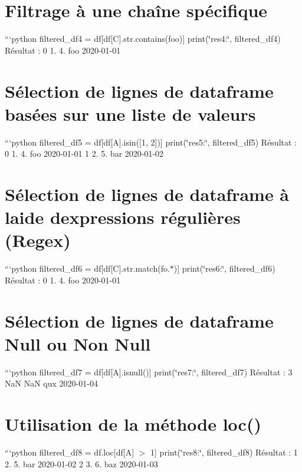 \section*{Filtrage à une chaîne spécifique}

```python filtered\+\_\+df4 = df\mbox{[}df\mbox{[}\textquotesingle{}C\textquotesingle{}\mbox{]}.str.\+contains(\textquotesingle{}foo\textquotesingle{})\mbox{]} print(\char`\"{}res4\+:\char`\"{}, filtered\+\_\+df4) Résultat \+: 0 1. 4. foo 2020-\/01-\/01

\section*{Sélection de lignes de dataframe basées sur une liste de valeurs}

```python filtered\+\_\+df5 = df\mbox{[}df\mbox{[}\textquotesingle{}A\textquotesingle{}\mbox{]}.isin(\mbox{[}1, 2\mbox{]})\mbox{]} print(\char`\"{}res5\+:\char`\"{}, filtered\+\_\+df5) Résultat \+: 0 1. 4. foo 2020-\/01-\/01 1 2. 5. bar 2020-\/01-\/02

\section*{Sélection de lignes de dataframe à l\textquotesingle{}aide d\textquotesingle{}expressions régulières (Regex)}

```python filtered\+\_\+df6 = df\mbox{[}df\mbox{[}\textquotesingle{}C\textquotesingle{}\mbox{]}.str.\+match(\textquotesingle{}fo.$\ast$\textquotesingle{})\mbox{]} print(\char`\"{}res6\+:\char`\"{}, filtered\+\_\+df6) Résultat \+: 0 1. 4. foo 2020-\/01-\/01

\section*{Sélection de lignes de dataframe Null ou Non Null}

```python filtered\+\_\+df7 = df\mbox{[}df\mbox{[}\textquotesingle{}A\textquotesingle{}\mbox{]}.isnull()\mbox{]} print(\char`\"{}res7\+:\char`\"{}, filtered\+\_\+df7) Résultat \+: 3 NaN NaN qux 2020-\/01-\/04

\section*{Utilisation de la méthode loc()}

```python filtered\+\_\+df8 = df.\+loc\mbox{[}df\mbox{[}\textquotesingle{}A\textquotesingle{}\mbox{]} $>$ 1\mbox{]} print(\char`\"{}res8\+:\char`\"{}, filtered\+\_\+df8) Résultat \+: 1 2. 5. bar 2020-\/01-\/02 2 3. 6. baz 2020-\/01-\/03

